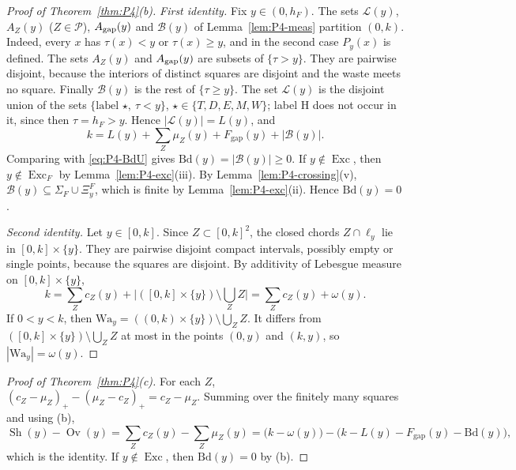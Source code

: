 \documentclass[11pt]{amsart}
\newcommand{\cP}{\mathcal P}
\newcommand{\Sh}{\operatorname{Sh}}
\newcommand{\Ov}{\operatorname{Ov}}
\newcommand{\Fgap}{F_{\mathrm{gap}}}
\newcommand{\Exc}{\operatorname{Exc}}
\theoremstyle{definition}
\theoremstyle{remark}
\numberwithin{equation}{section}
\begin{document}
\begin{proof}[Proof of Theorem~\ref{thm:P4}(b)]
\emph{First identity.} Fix $y\in(0,h_F)$. The sets $\mathcal L(y)$, $A_Z(y)$ ($Z\in\cP$), $A_{\rm gap}(y)$ and $\mathcal B(y)$ of Lemma~\ref{lem:P4-meas} partition $(0,k)$. Indeed, every $x$ has $\tau(x)<y$ or $\tau(x)\ge y$, and in the second case $P_y(x)$ is defined. The sets $A_Z(y)$ and $A_{\rm gap}(y)$ are subsets of $\{\tau>y\}$. They are pairwise disjoint, because the interiors of distinct squares are disjoint and the waste meets no square. Finally $\mathcal B(y)$ is the rest of $\{\tau\ge y\}$. The set $\mathcal L(y)$ is the disjoint union of the sets $\{\text{label }\star,\ \tau<y\}$, $\star\in\{T,D,E,M,W\}$; label H does not occur in it, since then $\tau=h_F>y$. Hence $|\mathcal L(y)|=L(y)$, and
\[
k=L(y)+\sum_Z\mu_Z(y)+\Fgap(y)+|\mathcal B(y)| .
\]
Comparing with \eqref{eq:P4-BdU} gives $\mathrm{Bd}(y)=|\mathcal B(y)|\ge0$. If $y\notin\Exc$, then $y\notin\Exc_F$ by Lemma~\ref{lem:P4-exc}(iii). By Lemma~\ref{lem:P4-crossing}(v), $\mathcal B(y)\subseteq\Sigma_F\cup\Xi^F_y$, which is finite by Lemma~\ref{lem:P4-exc}(ii). Hence $\mathrm{Bd}(y)=0$.

\emph{Second identity.} Let $y\in[0,k]$. Since $Z\subset[0,k]^2$, the closed chords $Z\cap\ell_y$ lie in $[0,k]\times\{y\}$. They are pairwise disjoint compact intervals, possibly empty or single points, because the squares are disjoint. By additivity of Lebesgue measure on $[0,k]\times\{y\}$,
\[
k=\sum_Zc_Z(y)+\Big|([0,k]\times\{y\})\setminus\bigcup_ZZ\Big|=\sum_Zc_Z(y)+\omega(y).
\]
If $0<y<k$, then $\mathrm{Wa}_y=((0,k)\times\{y\})\setminus\bigcup_ZZ$. It differs from $([0,k]\times\{y\})\setminus\bigcup_ZZ$ at most in the points $(0,y)$ and $(k,y)$, so $|\mathrm{Wa}_y|=\omega(y)$.
\end{proof}

\begin{proof}[Proof of Theorem~\ref{thm:P4}(c)]
For each $Z$, $(c_Z-\mu_Z)_+-(\mu_Z-c_Z)_+=c_Z-\mu_Z$. Summing over the finitely many squares and using (b),
\[
\Sh(y)-\Ov(y)=\sum_Zc_Z(y)-\sum_Z\mu_Z(y)=\big(k-\omega(y)\big)-\big(k-L(y)-\Fgap(y)-\mathrm{Bd}(y)\big),
\]
which is the identity. If $y\notin\Exc$, then $\mathrm{Bd}(y)=0$ by (b).
\end{proof}
\end{document}
